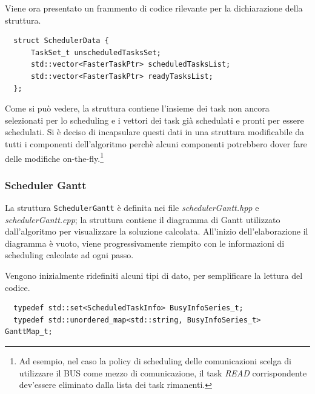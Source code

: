 Viene ora presentato un frammento di codice rilevante per la dichiarazione 
della struttura.
\newline
\begin{verbatim}
  struct SchedulerData {
      TaskSet_t unscheduledTasksSet;
      std::vector<FasterTaskPtr> scheduledTasksList;
      std::vector<FasterTaskPtr> readyTasksList;
  };
\end{verbatim}
Come si può vedere, la struttura contiene l'insieme dei task non ancora 
selezionati per lo scheduling e i vettori dei task già schedulati e pronti per 
essere schedulati. Si è deciso di incapsulare questi dati in una struttura 
modificabile da tutti i componenti dell'algoritmo perchè alcuni componenti 
potrebbero dover fare delle modifiche on-the-fly.\footnote{Ad esempio, nel caso 
la policy di scheduling delle comunicazioni scelga di utilizzare il BUS come 
mezzo di comunicazione, il task \emph{READ} corrispondente dev'essere 
eliminato dalla lista dei task rimanenti.}

\subsubsection{Scheduler Gantt}
La struttura \verb+SchedulerGantt+ è definita nei file 
\emph{schedulerGantt.hpp} e \emph{schedulerGantt.cpp}; la struttura contiene il 
diagramma di Gantt utilizzato dall'algoritmo per visualizzare la soluzione 
calcolata. All'inizio dell'elaborazione il diagramma è vuoto, viene 
progressivamente riempito con le informazioni di scheduling calcolate ad ogni 
passo.

Vengono inizialmente ridefiniti alcuni tipi di dato, per semplificare la lettura
del codice.
\newline
\begin{verbatim}
  typedef std::set<ScheduledTaskInfo> BusyInfoSeries_t;
  typedef std::unordered_map<std::string, BusyInfoSeries_t> GanttMap_t;
\end{verbatim}

